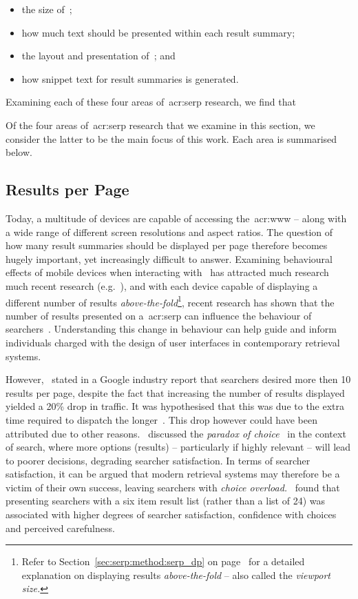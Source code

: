 \begin{itemize}
    \item{the size of~;}
    \item{how much text should be presented within each result summary;}
    \item{the layout and presentation of~; and}
    \item{how snippet text for result summaries is generated.}
\end{itemize}

Examining each of these four areas of~\gls{acr:serp} research, we find that 

Of the four areas of~\gls{acr:serp} research that we examine in this section, we consider the latter to be the main focus of this work. Each area is summarised below.

\subsection{Results per Page}
Today, a multitude of devices are capable of accessing the~\gls{acr:www} -- along with a wide range of different screen resolutions and aspect ratios. The question of how many result summaries should be displayed per page therefore becomes hugely important, yet increasingly difficult to answer. Examining behavioural effects of mobile devices when interacting with~ has attracted much research much recent research (e.g.~\cite{kim2012small_vs_large, kim2014eye_tracking, kim2016pagination_versus_scrolling}), and with each device capable of displaying a different number of results \emph{above-the-fold}\footnote{Refer to Section~\ref{sec:serp:method:serp_dp} on page~\pageref{sec:serp:method:serp_dp} for a detailed explanation on displaying results \emph{above-the-fold} -- also called the \emph{viewport size.}}, recent research has shown that the number of results presented on a~\gls{acr:serp} can influence the behaviour of searchers~\citep{joachims2005click_model, kim2014eye_tracking}. Understanding this change in behaviour can help guide and inform individuals charged with the design of user interfaces in contemporary retrieval systems.

However,~\cite{linden2006} stated in a Google industry report that searchers desired more then 10 results per page, despite the fact that increasing the number of results displayed yielded a 20\% drop in traffic. It was hypothesised that this was due to the extra time required to dispatch the longer~. This drop however could have been attributed due to other reasons.~\cite{oulasvirta2009serp_size} discussed the \emph{paradox of choice}~\citep{schwartz2005paradox_of_choice} in the context of search, where more options (results) -- particularly if highly relevant -- will lead to poorer decisions, degrading searcher satisfaction. In terms of searcher satisfaction, it can be argued that modern retrieval systems may therefore be a victim of their own success, leaving searchers with \emph{choice overload.}~\cite{oulasvirta2009serp_size} found that presenting searchers with a six item result list (rather than a list of 24) was associated with higher degrees of searcher satisfaction, confidence with choices and perceived carefulness.

